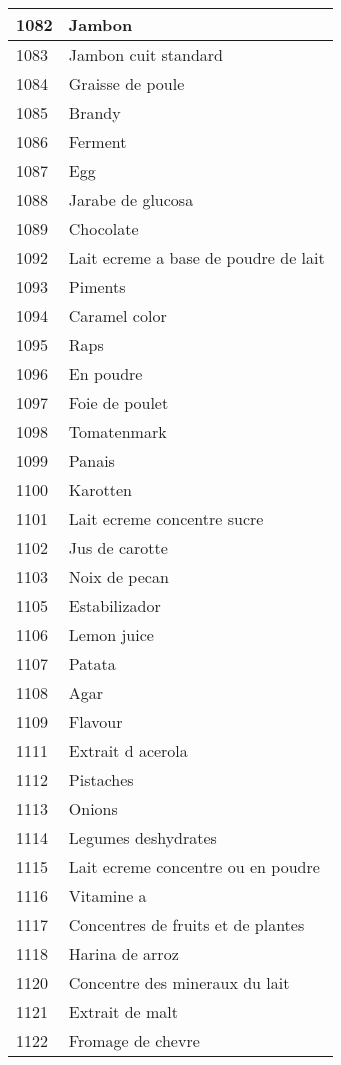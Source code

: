 \begin{longtable}{|l|l|}
1082 & Jambon \\ \hline 
1083 & Jambon cuit standard \\ \hline 
1084 & Graisse de poule \\ \hline 
1085 & Brandy \\ \hline 
1086 & Ferment \\ \hline 
1087 & Egg \\ \hline 
1088 & Jarabe de glucosa \\ \hline 
1089 & Chocolate \\ \hline 
1092 & Lait ecreme a base de poudre de lait \\ \hline 
1093 & Piments \\ \hline 
1094 & Caramel color \\ \hline 
1095 & Raps \\ \hline 
1096 & En poudre \\ \hline 
1097 & Foie de poulet \\ \hline 
1098 & Tomatenmark \\ \hline 
1099 & Panais \\ \hline 
1100 & Karotten \\ \hline 
1101 & Lait ecreme concentre sucre \\ \hline 
1102 & Jus de carotte \\ \hline 
1103 & Noix de pecan \\ \hline 
1105 & Estabilizador \\ \hline 
1106 & Lemon juice \\ \hline 
1107 & Patata \\ \hline 
1108 & Agar \\ \hline 
1109 & Flavour \\ \hline 
1111 & Extrait d acerola \\ \hline 
1112 & Pistaches \\ \hline 
1113 & Onions \\ \hline 
1114 & Legumes deshydrates \\ \hline 
1115 & Lait ecreme concentre ou en poudre \\ \hline 
1116 & Vitamine a \\ \hline 
1117 & Concentres de fruits et de plantes \\ \hline 
1118 & Harina de arroz \\ \hline 
1120 & Concentre des mineraux du lait \\ \hline 
1121 & Extrait de malt \\ \hline 
1122 & Fromage de chevre \\ \hline 

\end{longtable}
